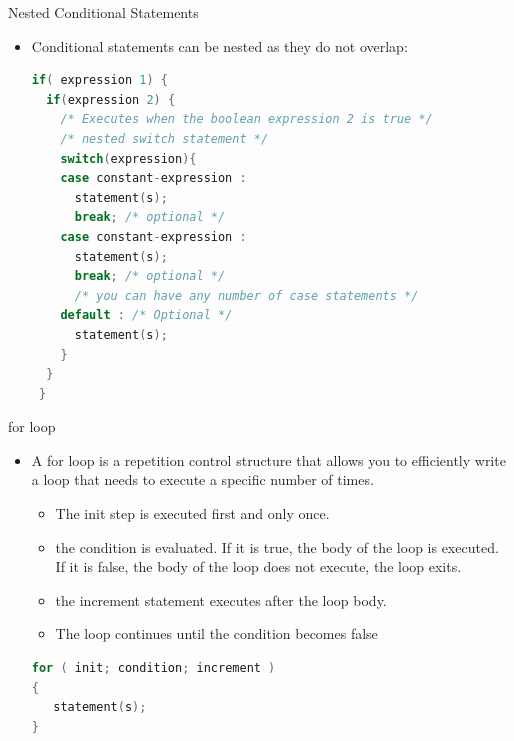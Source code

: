 \documentclass[10pt,t]{beamer}
\begin{document}
\begin{frame}[fragile]{Nested Conditional Statements}
  \begin{itemize}
    \item Conditional statements can be nested as they do not overlap:
      \begin{lstlisting}[language=C,basicstyle=\scriptsize\ttfamily]
if( expression 1) {
  if(expression 2) {
    /* Executes when the boolean expression 2 is true */
    /* nested switch statement */
    switch(expression){
    case constant-expression :
      statement(s);
      break; /* optional */
    case constant-expression :
      statement(s);
      break; /* optional */
      /* you can have any number of case statements */
    default : /* Optional */
      statement(s);
    }
  }
 }
      \end{lstlisting}
  \end{itemize}
\end{frame}

\begin{frame}[fragile]{for loop}
  \begin{itemize}
    \item A for loop is a repetition control structure that allows you to efficiently write a loop that needs to execute a specific number of times.
      \begin{itemize}
        \item The init step is executed first and only once.
        \item the condition is evaluated. If it is true, the body of the loop is executed. If it is false, the body of the loop does not execute, the loop exits.
        \item the increment statement executes after the loop body.
        \item The loop continues until the condition becomes false
      \end{itemize}
      \begin{lstlisting}[language=C,basicstyle=\scriptsize\ttfamily]
for ( init; condition; increment )
{
   statement(s);
}
      \end{lstlisting}
  \end{itemize}
\end{frame}
\end{document}
